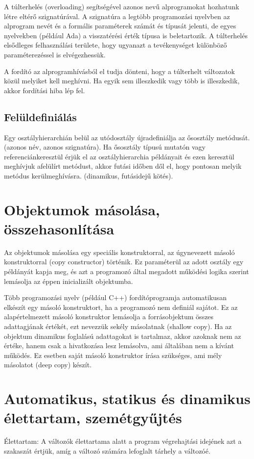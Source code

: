 \documentclass[margin=0px]{article}
\begin{document}
A túlterhelés (overloading) segítségével azonos nevű alprogramokat hozhatunk létre eltérő szignatúrával. A szignatúra a legtöbb programozási nyelvben az alprogram nevét és a formális paraméterek számát és típusát jelenti, de egyes nyelvekben (például Ada) a visszatérési érték típusa is beletartozik. A túlterhelés elsődleges felhasználási területe, hogy ugyanazt a tevékenységet különböző paraméterezéssel is elvégezhessük.

A fordító az alprogramhívásból el tudja dönteni, hogy a túlterhelt változatok közül melyiket kell meghívni. Ha egyik sem illeszkedik vagy több is illeszkedik, akkor fordítási hiba lép fel.

\subsection{Felüldefiniálás}
Egy osztályhierarchián belül az utódosztály újradefiniálja az ősosztály metódusát.(azonos név, azonos szignatúra). Ha ősosztály típusú mutatón vagy referenciánkeresztül érjük el az osztályhierarchia példányait és ezen keresztül meghívjuk afelülírt metódust, akkor futási időben dől el, hogy pontosan melyik metódus kerülmeghívásra. (dinamikus, futásidejű kötés).

\section{Objektumok másolása, összehasonlítása}

Az objektumok másolása egy speciális konstruktorral, az úgynevezett másoló konstruktorral (copy constructor) történik. Ez paraméterül az adott osztály egy példányát kapja meg, és azt a programozó által megadott működési logika szerint lemásolja az éppen inicializált objektumba.

Több programozási nyelv (például C++) fordítóprogramja automatikusan elkészít egy másoló konstruktort, ha a programozó nem definiál sajátot. Ez az alapértelmezett másoló konstruktor lemásolja a forrásobjektum összes adattagjának értékét, ezt nevezzük sekély másolatnak (shallow copy). Ha az objektum dinamikus foglalású adattagokat is tartalmaz, akkor azoknak nem az értéke, hanem csak a hivatkozása lesz lemásolva, ami általában nem a kívánt működés. Ez esetben saját másoló konstruktor írása szükséges, ami mély másolatot (deep copy) készít.

\section{Automatikus, statikus és dinamikus élettartam, szemétgyűjtés}
Élettartam: A változók élettartama alatt a program végrehajtási idejének azt a szakaszát értjük, amíg a változó számára lefoglalt tárhely a változóé.
\end{document}
